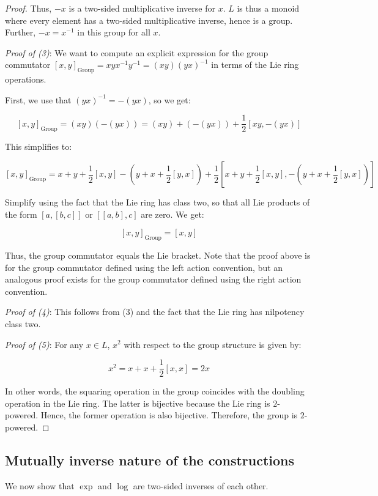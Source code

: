 \documentclass{ucetd}
\begin{document}
\begin{proof}
  Thus, $-x$ is a two-sided multiplicative inverse for $x$. $L$ is
  thus a monoid where every element has a two-sided multiplicative
  inverse, hence is a group. Further, $-x = x^{-1}$ in this group for
  all $x$.

  {\em Proof of (3)}: We want to compute an explicit expression for
  the group commutator $[x,y]_{\text{Group}} = xyx^{-1}y^{-1} = (xy)(yx)^{-1}$ in
  terms of the Lie ring operations.

  First, we use that $(yx)^{-1} = -(yx)$, so we get:

  $$[x,y]_{\text{Group}} = (xy)(-(yx)) = (xy) + (-(yx)) + \frac{1}{2}[xy,-(yx)]$$

  This simplifies to:

  $$[x,y]_{\text{Group}} = x + y + \frac{1}{2}[x,y] - (y + x + \frac{1}{2}[y,x]) + \frac{1}{2}[x + y + \frac{1}{2}[x,y],-(y + x + \frac{1}{2}[y,x])]$$

  Simplify using the fact that the Lie ring has class two, so that all
  Lie products of the form $[a,[b,c]]$ or $[[a,b],c]$ are zero. We get:

  $$[x,y]_{\text{Group}} = [x,y]$$

  Thus, the group commutator equals the Lie bracket. Note that the
  proof above is for the group commutator defined using the left
  action convention, but an analogous proof exists for the group
  commutator defined using the right action convention.

  {\em Proof of (4)}: This follows from (3) and the fact that the Lie
  ring has nilpotency class two.

  {\em Proof of (5)}: For any $x \in L$, $x^2$ with respect to the
  group structure is given by:

  $$x^2 = x + x + \frac{1}{2}[x,x] = 2x$$

  In other words, the squaring operation in the group coincides with
  the doubling operation in the Lie ring. The latter is bijective
  because the Lie ring is $2$-powered. Hence, the former operation is
  also bijective. Therefore, the group is $2$-powered.
\end{proof}

\subsection{Mutually inverse nature of the constructions}

We now show that $\exp$ and $\log$ are two-sided inverses of each
other.
\end{document}
